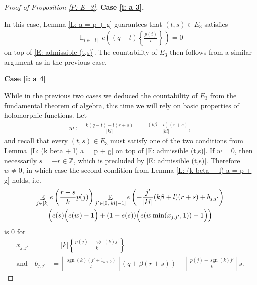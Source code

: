 \documentclass[11pt]{amsart}
\theoremstyle{definition}
\DeclareMathOperator*{\E}{\mathbb{E}}
\newcommand{\R}{{\mathbb R}}
\newcommand{\Z}{{\mathbb Z}}
\newcommand{\1}{{\mathbf{1}}}
\DeclareMathOperator{\sgn}{sgn}
\newcommand{\brac}[1]{\mathopen{}\left( #1 \mathclose{}\right)}
\newcommand{\Bigbrac}[1]{\Bigl( #1 \Bigr)}
\newcommand{\floor}[1]{{\left \lfloor #1 \right \rfloor}}
\newcommand{\rem}[1]{\left \{ #1 \right \}}
\begin{document}
\begin{proof}[Proof of Proposition \ref{P: E_3}]
\smallskip
\textbf{Case \eqref{i: a 3}.}
\smallskip
         
         In this case, Lemma \ref{L: a = p + g} guarantees that $(t,s)\in E_3$ satisfies 
         \begin{align}\label{E: reduced exp sum 3}
             \E_{i\in[{l}]}e\brac{(q-t)\rem{\frac{p(i)}{l}}} =0
         \end{align}
         on top of \eqref{E: admissible (t,s)}. The countability of $E_3$ then follows from a similar argument as in the previous case.
        

        \smallskip
        \textbf{Case \eqref{i: a 4}}
        \smallskip

        While in the previous two cases we deduced the countability of $E_3$ from the fundamental theorem of algebra, this time we will rely on basic properties of holomorphic functions.
        Let
        \begin{align*}
            w:= {\frac{k(q-t)-l(r+s)}{|kl|} = \frac{-(k\beta +l)(r+s)}{|kl|},}
        \end{align*}
        and recall that every $(t,s)\in E_3$ must satisfy one of the two conditions from Lemma~\ref{L: (k beta + l) a  = p + g} on top of \eqref{E: admissible (t,s)}.
        If $w=0$, then necessarily $s=-r\in\Z$, which is precluded by \eqref{E: admissible (t,s)}.
        Therefore $w\neq 0$, in which case the second condition from Lemma \ref{L: (k beta + l) a  = p + g} holds, i.e. %
\begin{multline}\label{E: tricky exp sum}
    \E_{j\in[k]}e\left(\frac{{r+s}}{k}p(j)\right)\E_{j'\in[0, |kl|-1]}e\left(-\frac{j'}{|kl|}(k\beta + l)(r+s)+b_{j,j'}\right)\\
    \brac{e(s)\Bigbrac{e({w})-1}+(1-e(s))\Bigbrac{e({w\min(x_{j,j'},1)})-1}}
\end{multline}    
is 0
for 
\begin{align*}
    x_{j,j'} &=|k|\left\{\frac{p(j)-\sgn(k)j'}{k}\right\}\\
    \textrm{and}\quad b_{j,j'} &= \floor{\frac{\sgn(k)(j' +1_{k<0})}{l}}(q+\beta(r+s)) -\floor{\frac{p(j)-\sgn(k)j'}{k}}s. 
\end{align*}



\end{proof}
\end{document}
